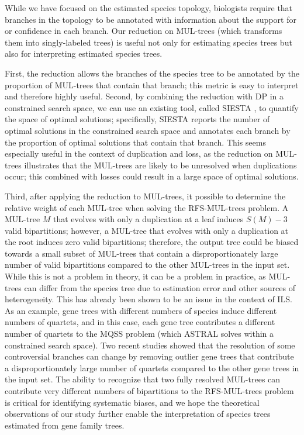 While we have focused on the estimated species topology, biologists require that branches in the topology to be annotated with information about the support for or confidence in each branch.
Our reduction on MUL-trees (which transforms them into singly-labeled trees) is useful not only for estimating species trees but also for interpreting estimated species trees.

First, the reduction allows the branches of the species tree to be annotated by the proportion of MUL-trees that contain that branch; this metric is easy to interpret and therefore highly useful.
Second, by combining the reduction with DP in a constrained search space, we can use an existing tool, called SIESTA \cite{vachaspati2017enhancing}, to quantify the space of optimal solutions; specifically, SIESTA reports the number of optimal solutions in the constrained search space and annotates each branch by the proportion of optimal solutions that contain that branch.
This seems especially useful in the context of duplication and loss, as the reduction on MUL-trees illustrates that the MUL-trees are likely to be unresolved when duplications occur; this combined with losses could result in a large space of optimal solutions.

Third, after applying the reduction to MUL-trees, it possible to determine the relative weight of each MUL-tree when solving the RFS-MUL-trees problem.
A MUL-tree $M$ that evolves with only a duplication at a leaf induces $S(M) - 3$ valid bipartitions; however, a MUL-tree that evolves with only a duplication at the root induces zero valid bipartitions; therefore, the output tree could be biased towards a small subset of MUL-trees that contain a disproportionately large number of valid bipartitions compared to the other MUL-trees in the input set.
While this is not a problem in theory, it can be a problem in practice, as MUL-trees can differ from the species tree due to estimation error and other sources of heterogeneity.
This has already been shown to be an issue in the context of ILS.
As an example, gene trees with different numbers of species induce different numbers of quartets, and in this case, each gene tree contributes a different number of quartets to the MQSS problem (which ASTRAL solves within a constrained search space).
Two recent studies \cite{gatesy2017resolving-pcs, gatesy2019partitioned} showed that the resolution of some controversial branches can change by removing outlier gene trees that contribute a disproportionately large number of quartets compared to the other gene trees in the input set.
The ability to recognize that two fully resolved MUL-trees can contribute very different numbers of bipartitions to the RFS-MUL-trees problem is critical for identifying systematic biases, and we hope the theoretical observations of our study further enable the interpretation of species trees estimated from gene family trees.

